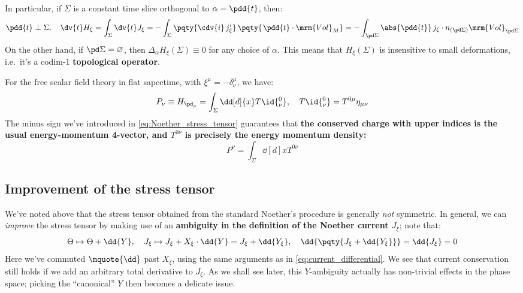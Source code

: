 \documentclass[a4paper
	,10pt
]{article}
\begin{document}
	In particular, if $\Sigma$ is a constant time slice orthogonal to $\alpha = \pdd{t}$, then:
	\begin{equation}
		\pdd{t} \perp \Sigma,
	\quad
		\dv{t} H_\xi
		= \int_\Sigma \dv{t} J_\xi
		= - \int_\Sigma
			\pqty{\cdv{i}\,j^i_\xi}\,
			\pqty{\mspace{2mu}
				\pdd{t} \cdot \mrm{Vol}_M
			}
		= - \int_{\pd\Sigma} \abs{\pdd{t}}\,
			j_\xi \cdot n_{(\pd\Sigma)}
			\mrm{Vol}_{\pd\Sigma}
	\end{equation}
	On the other hand, if $\pd\Sigma = \varnothing$, then $\Delta_{\alpha} H_\xi(\Sigma) \equiv 0$ for any choice of $\alpha$. This means that $H_\xi(\Sigma)$ is insensitive to small deformations, i.e.~it's a codim-1 \textbf{topological operator}. 
	
	For the free scalar field theory in flat sapcetime, with $\xi^\mu = -\delta^\mu_\nu$, we have:
	\begin{equation}
		P_\nu \equiv H_{\pd_\nu}
		= \int_\Sigma \dd[d]{x} T\id{^0_\nu},
	\quad
		T\id{^0_\nu}
		= T^{0\mu} \eta_{\mu\nu}
	\end{equation}
	The minus sign we've introduced in \eqref{eq:Noether_stress_tensor} guarantees that \textbf{the conserved charge with upper indices is the usual energy-momentum 4-vector, and $T^{0\nu}$ is precisely the energy momentum density:}
	\begin{equation}
		P^\nu = \int_\Sigma \dd[d]{x} T^{0\nu}
	\end{equation}
	
	
	
	
	
\subsection{Improvement of the stress tensor}
	We've noted above that the stress tensor obtained from the standard Noether's procedure is generally \textit{not} symmetric. In general, we can \textit{improve} the stress tensor by making use of an \textbf{ambiguity in the definition of the Noether current $J_\xi$}; note that:
	\begin{equation}
		\Theta \mapsto \Theta + \dd{Y},
	\quad
		J_\xi \mapsto J_\xi + X_\xi \cdot \dd{Y}
		= J_\xi + \dd{Y_\xi},
	\quad
		\dd{\pqty{
			J_\xi + \dd{Y_\xi}
		}} = \dd{J_\xi} = 0
	\end{equation}
	Here we've commuted $\mquote{\dd}$ past $X_\xi$, using the same arguments as in \eqref{eq:current_differential}. 
	We see that current conservation still holds if we add an arbitrary total derivative to $J_\xi$. 
	As we shall see later, this $Y$-ambiguity actually has non-trivial effects in the phase space; picking the ``canonical'' $Y$ then becomes a delicate issue. 
	
\end{document}
